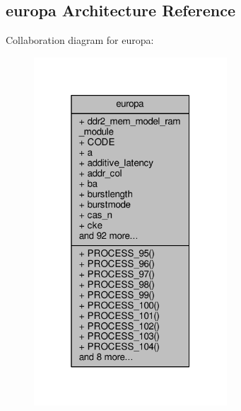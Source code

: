 \subsection{europa Architecture Reference}
\label{classddr2__mem__model_1_1europa}


Collaboration diagram for europa\+:\nopagebreak
\begin{figure}[H]
\begin{center}
\leavevmode
\includegraphics[width=205pt]{de/d1b/classddr2__mem__model_1_1europa__coll__graph}
\end{center}
\end{figure}
